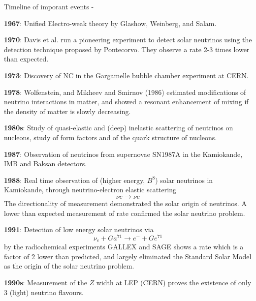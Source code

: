 \begin{frame}[t,allowframebreaks]{Timeline of imporant events - }
\begin{itemize}
{  \framebreak

  \item {\bf 1967}: Unified Electro-weak theory by
   Glashow, Weinberg, and Salam.

  \item {\bf 1970}: Davis et al. run a pioneering experiment to detect solar
   neutrinos using the detection technique proposed by Pontecorvo.
   They observe a rate 2-3 times lower than expected.

  \item {\bf 1973}: Discovery of NC in the Gargamelle bubble
   chamber experiment at CERN.

  \item {\bf 1978}: Wolfenstein, and Mikheev and Smirnov (1986)
   estimated modifications of neutrino interactions in matter,
   and showed a resonant enhancement of mixing if the density of matter
   is slowly decreasing.

  \item {\bf 1980s}: Study of quasi-elastic and (deep)
    inelastic scattering of neutrinos on nucleons, study of form factors
    and of the quark structure of nucleons.

  \item {\bf 1987}: Observation of neutrinos from supernovae SN1987A in the
   Kamiokande, IMB and Baksan detectors.

  \item {\bf 1988}: Real time observation of (higher energy, $B^8$)
   solar neutrinos in Kamiokande, through neutrino-electron elastic scattering
   \begin{equation*}
     \nu e \rightarrow \nu e
   \end{equation*}
   The directionality of measurement demonstrated the solar origin of neutrinos.
   A lower than expected measurement of rate confirmed the solar neutrino problem.

  \item {\bf 1991}: Detection of low energy solar neutrinos via
  \begin{equation*}
    \nu_e + Ga^{71} \rightarrow e^{-} + Ge^{71}
  \end{equation*}
  by the radiochemical experiments GALLEX and SAGE shows a rate which is a factor
  of 2 lower than predicted, and largely eliminated the Standard
  Solar Model as the origin of the solar neutrino problem.

  \item {\bf 1990s}: Measurement of the $Z$ width at LEP (CERN) proves the
  existence of only 3 (light) neutrino flavours.

}
\end{itemize}
\end{frame}

